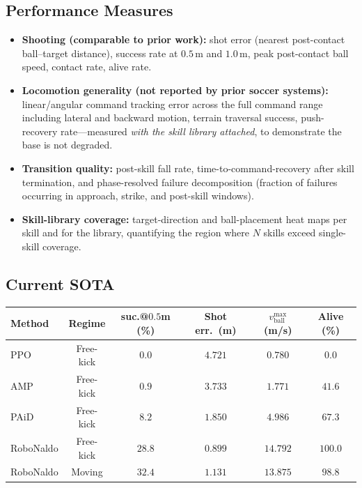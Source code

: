 \documentclass{article}
\begin{document}
\subsection{Performance Measures}
\begin{itemize}
  \item \textbf{Shooting (comparable to prior work):} shot error (nearest post-contact ball--target distance), success rate at $0.5$\,m and $1.0$\,m, peak post-contact ball speed, contact rate, alive rate.
  \item \textbf{Locomotion generality (not reported by prior soccer systems):} linear/angular command tracking error across the full command range including lateral and backward motion, terrain traversal success, push-recovery rate---measured \emph{with the skill library attached}, to demonstrate the base is not degraded.
  \item \textbf{Transition quality:} post-skill fall rate, time-to-command-recovery after skill termination, and phase-resolved failure decomposition (fraction of failures occurring in approach, strike, and post-skill windows).
  \item \textbf{Skill-library coverage:} target-direction and ball-placement heat maps per skill and for the library, quantifying the region where $N$ skills exceed single-skill coverage.
\end{itemize}

\subsection{Current SOTA}
\begin{table}[H]
\centering
\begin{tabular}{lccccc}
\toprule
Method & Regime & suc.@$0.5$m (\%) & Shot err.\ (m) & $v^{\max}_{\mathrm{ball}}$ (m/s) & Alive (\%) \\
\midrule
PPO \citep{ppo}          & Free-kick & $0.0$  & $4.721$ & $0.780$  & $0.0$ \\
AMP \citep{amp}          & Free-kick & $0.9$  & $3.733$ & $1.771$  & $41.6$ \\
PAiD \citep{paid}        & Free-kick & $8.2$  & $1.850$ & $4.986$  & $67.3$ \\
RoboNaldo \citep{robonaldo} & Free-kick & $\mathbf{28.8}$ & $\mathbf{0.899}$ & $\mathbf{14.792}$ & $\mathbf{100.0}$ \\
RoboNaldo \citep{robonaldo} & Moving    & $32.4$ & $1.131$ & $13.875$ & $98.8$ \\
\bottomrule
\end{tabular}
\end{table}
\end{document}
